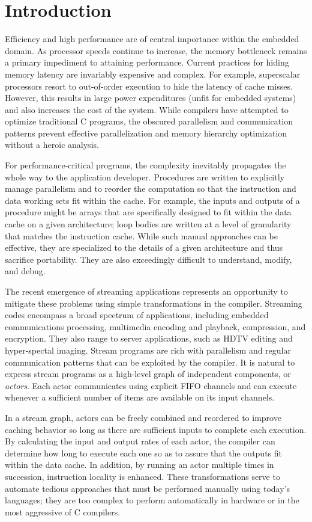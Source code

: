 \section{Introduction}

Efficiency and high performance are of central importance within the
embedded domain.  As processor speeds continue to increase, the memory
bottleneck remains a primary impediment to attaining performance.
Current practices for hiding memory latency are invariably expensive
and complex.  For example, superscalar processors resort to
out-of-order execution to hide the latency of cache misses.  However,
this results in large power expenditures (unfit for embedded systems)
and also increases the cost of the system.  While compilers have
attempted to optimize traditional C programs, the obscured parallelism
and communication patterns prevent effective parallelization and
memory hierarchy optimization without a heroic analysis.

For performance-critical programs, the complexity inevitably
propagates the whole way to the application developer.  Procedures are
written to explicitly manage parallelism and to reorder the
computation so that the instruction and data working sets fit within
the cache.  For example, the inputs and outputs of a procedure might
be arrays that are specifically designed to fit within the data cache
on a given architecture; loop bodies are written at a level of
granularity that matches the instruction cache.  While such manual
approaches can be effective, they are specialized to the details of a
given architecture and thus sacrifice portability.  They are also
exceedingly difficult to understand, modify, and debug.

The recent emergence of streaming applications represents an
opportunity to mitigate these problems using simple transformations in
the compiler.  Streaming codes encompass a broad spectrum of
applications, including embedded communications processing, multimedia
encoding and playback, compression, and encryption.  They also range
to server applications, such as HDTV editing and hyper-spectal
imaging.  Stream programs are rich with parallelism and regular
communication patterns that can be exploited by the compiler.  It is
natural to express stream programs as a high-level graph of
independent components, or {\it actors}.  Each actor communicates
using explicit FIFO channels and can execute whenever a sufficient
number of items are available on its input channels.

In a stream graph, actors can be freely combined and reordered to
improve caching behavior so long as there are sufficient inputs to
complete each execution.  By calculating the input and output rates of
each actor, the compiler can determine how long to execute each one so
as to assure that the outputs fit within the data cache.  In addition,
by running an actor multiple times in succession, instruction locality
is enhanced.  These transformations serve to automate tedious
approaches that must be performed manually using today's languages;
they are too complex to perform automatically in hardware or in the
most aggressive of C compilers.

